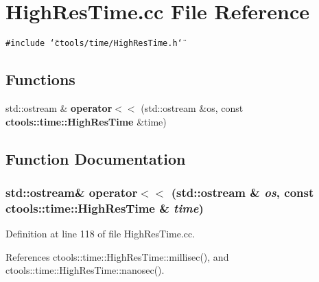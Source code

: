\section{High\-Res\-Time.cc File Reference}
\label{HighResTime_8cc}
{\tt \#include \char`\"{}ctools/time/High\-Res\-Time.h\char`\"{}}\par
\subsection*{Functions}
\begin{CompactItemize}
\item 
std::ostream \& {\bf operator$<$$<$} (std::ostream \&os, const {\bf ctools::time::High\-Res\-Time} \&time)
\end{CompactItemize}


\subsection{Function Documentation}
\subsubsection{\setlength{\rightskip}{0pt plus 5cm}std::ostream\& operator$<$$<$ (std::ostream \& {\em os}, const {\bf ctools::time::High\-Res\-Time} \& {\em time})}\label{HighResTime_8cc_a0}




Definition at line 118 of file High\-Res\-Time.cc.

References ctools::time::High\-Res\-Time::millisec(), and ctools::time::High\-Res\-Time::nanosec().